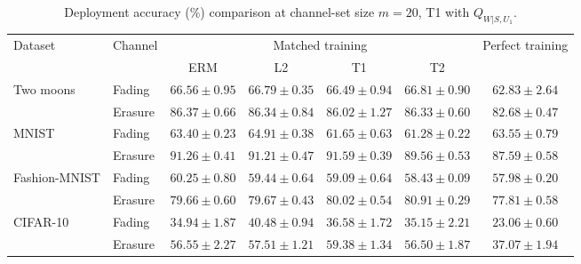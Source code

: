 \begin{table}[htb]
\centering
\caption{Deployment accuracy (\%) comparison at channel-set size $m=20$, T1 with $Q_{W|S,U_1}$.}
\label{tab:performance}
\begin{tabular*}{\linewidth}{@{\extracolsep{\fill}}llccccc@{}}
\toprule
\multirow{2}{*}{Dataset} & \multirow{2}{*}{Channel}
& \multicolumn{4}{c}{Matched training} & \multirow{2}{*}{Perfect training} \\
\cmidrule(lr){3-6}
& & ERM & L2 & T1 & T2 &  \\
\midrule
\multirow{2}{*}{Two moons}
& Fading
& $66.56\pm0.95$ & $66.79\pm0.35$ & $66.49\pm0.94$ & $\mathbf{66.81}\pm0.90$ & $62.83\pm2.64$ \\
& Erasure
& $\mathbf{86.37}\pm0.66$ & $86.34\pm0.84$ & $86.02\pm1.27$ & $86.33\pm0.60$ & $82.68\pm0.47$ \\
\midrule
\multirow{2}{*}{MNIST}
& Fading
& $63.40\pm0.23$ & $\mathbf{64.91}\pm0.38$ & $61.65\pm0.63$ & $61.28\pm0.22$ & $63.55\pm0.79$ \\
& Erasure
& $91.26\pm0.41$ & $91.21\pm0.47$ & $\mathbf{91.59}\pm0.39$ & $89.56\pm0.53$ & $87.59\pm0.58$ \\
\midrule
\multirow{2}{*}{Fashion-MNIST}
& Fading
& $\mathbf{60.25}\pm0.80$ & $59.44\pm0.64$ & $59.09\pm0.64$ & $58.43\pm0.09$ & $57.98\pm0.20$ \\
& Erasure
& $79.66\pm0.60$ & $79.67\pm0.43$ & $80.02\pm0.54$ & $\mathbf{80.91}\pm0.29$ & $77.81\pm0.58$ \\
\midrule
\multirow{2}{*}{CIFAR-10}
& Fading
& $34.94\pm1.87$ & $\mathbf{40.48}\pm0.94$ & $36.58\pm1.72$ & $35.15\pm2.21$ & $23.06\pm0.60$ \\
& Erasure
& $56.55\pm2.27$ & $57.51\pm1.21$ & $\mathbf{59.38}\pm1.34$ & $56.50\pm1.87$ & $37.07\pm1.94$ \\
\bottomrule
\end{tabular*}
\end{table}

